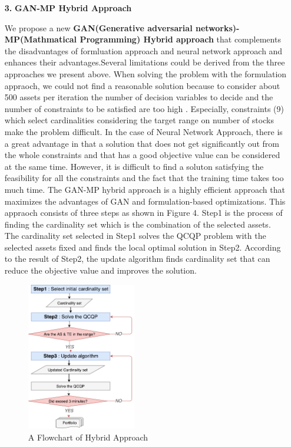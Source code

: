\documentclass[11pt]{article}
\begin{document}
\begin{itemize}
\item[\textbf{3.}] \textbf{GAN-MP Hybrid Approach} %
	\item[] We propose a new \textbf{GAN(Generative adversarial networks)-MP(Mathmatical Programming) Hybrid approach} that complements the disadvantages of formluation approach and neural network approach and enhances their advantages.Several limitations could be derived from the three approaches we present above. When solving the problem with the formulation appraoch, we could not find a reasonable solution because to consider about 500 assets per iteration the number of decision variables to decide and the number of constraints to be satisfied are too high . Especially, constraints (9) which select cardinalities considering the target range on number of stocks make the problem difficult. 
	In the case of Neural Network Approach, there is a great advantage in that a solution that does not get significantly out from the whole constraints and that has a good objective value can be considered at the same time. However, it is difficult to find a soluton satisfying the feasibility for all the constraints and the fact that the training time takes too much time. The GAN-MP hybrid approach is a highly efficient approach that maximizes the advantages of GAN and formulation-based optimizations. This appraoch consists of three steps as shown in Figure 4. Step1 is the process of finding the cardinality set which is the combination of the selected assets. The cardinality set selected in Step1 solves the QCQP problem with the selected assets fixed and finds the local optimal solution in Step2. According to the result of Step2, the update algorithm finds cardinality set that can reduce the objective value and improves the solution.
	\begin{figure}[h] 
		\begin{center}
			\includegraphics[width=0.45\textwidth]{flowchart}
			\caption{A Flowchart of Hybrid Approach} \label{fig:flowchart}
		\end{center}
	\end{figure}


\end{itemize}
\end{document}
